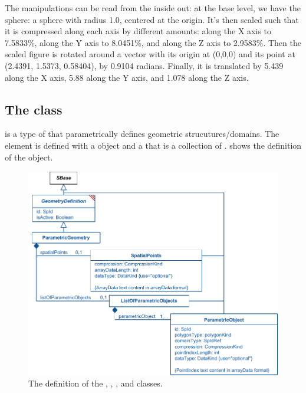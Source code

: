 The manipulations can be read from the inside out: at the base level, we have the \CSGPrimitive sphere: a sphere with radius 1.0, centered at the origin.  It's then scaled such that it is compressed along each axis by different amounts: along the X axis to 7.5833\%, along the Y axis to 8.0451\%, and along the Z axis to 2.9583\%.  Then the scaled figure is rotated around a vector with its origin at (0,0,0) and its point at (2.4391, 1.5373, 0.58404), by 0.9104 radians.  Finally, it is translated by 5.439 along the X axis, 5.88 along the Y axis, and 1.078 along the Z axis.

\subsection{The  class}
\label{parametricgeometry-class}
\label{listofparametricobjects-class}
\ParametricGeometry is a type of \GeometryDefinition that parametrically defines geometric strucutures/domains. The \ParametricGeometry element is defined with a \SpatialPoints object and a  that is a collection of \ParametricObjects.  shows the definition of the \ParametricGeometry object.

\begin{figure}[ht]
  \includegraphics{figs/ParametricGeometry-uml}
  \caption{The definition of the \ParametricGeometry, \SpatialPoints, \ListOfParametricObjects, and \ParametricObject classes.}
  \label{ParametricGeometry-uml}
  \label{SpatialPoints-uml}
  \label{ListOfParametricObjects-uml}
  \label{ParametricObject-uml}
  \label{PolygonObject-uml}
\end{figure}


